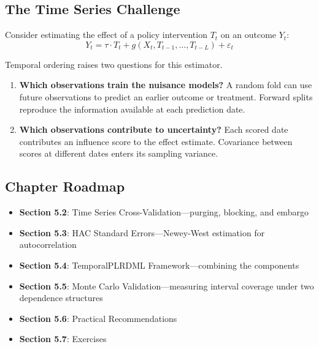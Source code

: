 \subsection{The Time Series Challenge}

Consider estimating the effect of a policy intervention $T_t$ on an outcome $Y_t$:
\begin{equation}
Y_t = \tau \cdot T_t + g(X_t, T_{t-1}, \ldots, T_{t-L}) + \varepsilon_t
\end{equation}

Temporal ordering raises two questions for this estimator.

\begin{enumerate}
    \item \textbf{Which observations train the nuisance models?} A random fold can use future observations to predict an earlier outcome or treatment. Forward splits reproduce the information available at each prediction date.

    \item \textbf{Which observations contribute to uncertainty?} Each scored date contributes an influence score to the effect estimate. Covariance between scores at different dates enters its sampling variance.
\end{enumerate}


\subsection{Chapter Roadmap}

\begin{itemize}
    \item \textbf{Section 5.2}: Time Series Cross-Validation---purging, blocking, and embargo
    \item \textbf{Section 5.3}: HAC Standard Errors---Newey-West estimation for autocorrelation
    \item \textbf{Section 5.4}: TemporalPLRDML Framework---combining the components
    \item \textbf{Section 5.5}: Monte Carlo Validation---measuring interval coverage under two dependence structures
    \item \textbf{Section 5.6}: Practical Recommendations
    \item \textbf{Section 5.7}: Exercises
\end{itemize}

